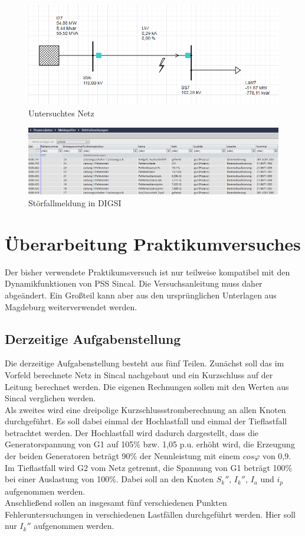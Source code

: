 \documentclass{scrartcl}
\begin{document}
\begin{onehalfspace}
	\begin{figure}[H]
	\centering
	\includegraphics[scale=0.4]{img/distschutz-netz.png}
	\caption{Untersuchtes Netz}
	\end{figure}

	\begin{figure}[H]
	\centering
	\includegraphics[scale=0.5]{img/digsi.png}
	\caption{Störfallmeldung in DIGSI}
	\end{figure}


\section{Überarbeitung Praktikumversuches}
Der bisher verwendete Praktikumsversuch ist nur teilweise kompatibel mit den Dynamikfunktionen von PSS Sincal. Die Versuchsanleitung muss daher abgeändert. Ein Großteil kann aber aus den ursprünglichen Unterlagen aus Magdeburg weiterverwendet werden.

\subsection{Derzeitige Aufgabenstellung}
Die derzeitige Aufgabenstellung besteht aus fünf Teilen. Zunächst soll das im Vorfeld berechnete Netz in Sincal nachgebaut und ein Kurzschluss auf der Leitung berechnet werden. Die eigenen Rechnungen sollen mit den Werten aus Sincal verglichen werden. \\
Als zweites wird eine dreipolige Kurzschlussstromberechnung an allen Knoten durchgeführt. Es soll dabei einmal der Hochlastfall und einmal der Tieflastfall betrachtet werden. Der Hochlastfall wird dadurch dargestellt, dass die Generatorspannung von G1 auf 105\% bzw. 1,05 p.u. erhöht wird, die Erzeugung der beiden Generatoren beträgt 90\% der Nennleistung mit einem $cos \varphi $ von 0,9. Im Tieflastfall wird G2 vom Netz getrennt, die Spannung von G1 beträgt 100\% bei einer Auslastung von 100\%. Dabei soll an den Knoten $S_k''$, $I_k''$, $I_a$ und $i_p$ aufgenommen werden. \\
Anschließend sollen an insgesamt fünf verschiedenen Punkten Fehleruntersuchungen in verschiedenen Lastfällen durchgeführt werden. Hier soll nur $I_k''$ aufgenommen werden.


\end{onehalfspace}
\end{document}
